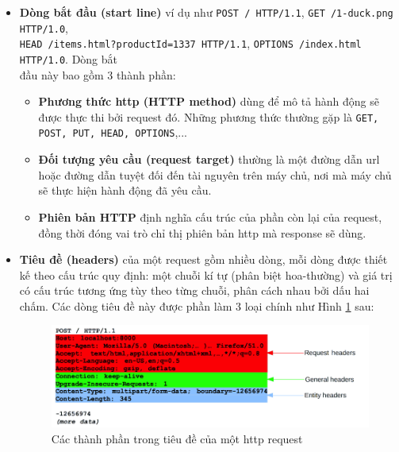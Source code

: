 \begin{itemize}
    \item \textbf{Dòng bắt đầu (start line)} ví dụ như \colorbox{gray!30}{\texttt{POST / HTTP/1.1}}, \colorbox{gray!30}{\texttt{GET /1-duck.png HTTP/1.0}},\\\colorbox{gray!30}{\texttt{HEAD /items.html?productId=1337 HTTP/1.1}}, \colorbox{gray!30}{\texttt{OPTIONS /index.html HTTP/1.0}}. Dòng bắt \\đầu này bao gồm 3 thành phần:
        \begin{itemize}
            \item \textbf{Phương thức \acrshort{http} (HTTP method)} dùng để mô tả hành động sẽ được thực thi bởi request đó. Những phương thức thường gặp là \texttt{GET, POST, PUT, HEAD, OPTIONS},...
            \item \textbf{Đối tượng yêu cầu (request target)} thường là một đường dẫn \acrshort{url} hoặc đường dẫn tuyệt đối đến tài nguyên trên máy chủ, nơi mà máy chủ sẽ thực hiện hành động đã yêu cầu.
            \item \textbf{Phiên bản HTTP} định nghĩa cấu trúc của phần còn lại của request, đồng thời đóng vai trò chỉ thị phiên bản \acrshort{http} mà response sẽ dùng.
        \end{itemize}
    \item \textbf{Tiêu đề (headers)} của một request gồm nhiều dòng, mỗi dòng được thiết kế theo cấu trúc quy định: một chuỗi kí tự (phân biệt hoa-thường) và giá trị có cấu trúc tương ứng tùy theo từng chuỗi, phân cách nhau bởi dấu hai chấm. Các dòng tiêu đề này được phần làm 3 loại chính như Hình \ref{fig:HTTP-request-headers} sau:
        \begin{figure}[H]
          \centering
            \includegraphics[width=\textwidth,keepaspectratio=true]{images/HTTP-request-headers.png}
          \caption[Các thành phần trong tiêu đề của một \acrshort{http} request]{Các thành phần trong tiêu đề của một \acrshort{http} request \protect\parencite{mdn-HTTP-message}}
          \label{fig:HTTP-request-headers}
        \end{figure}

\end{itemize}

